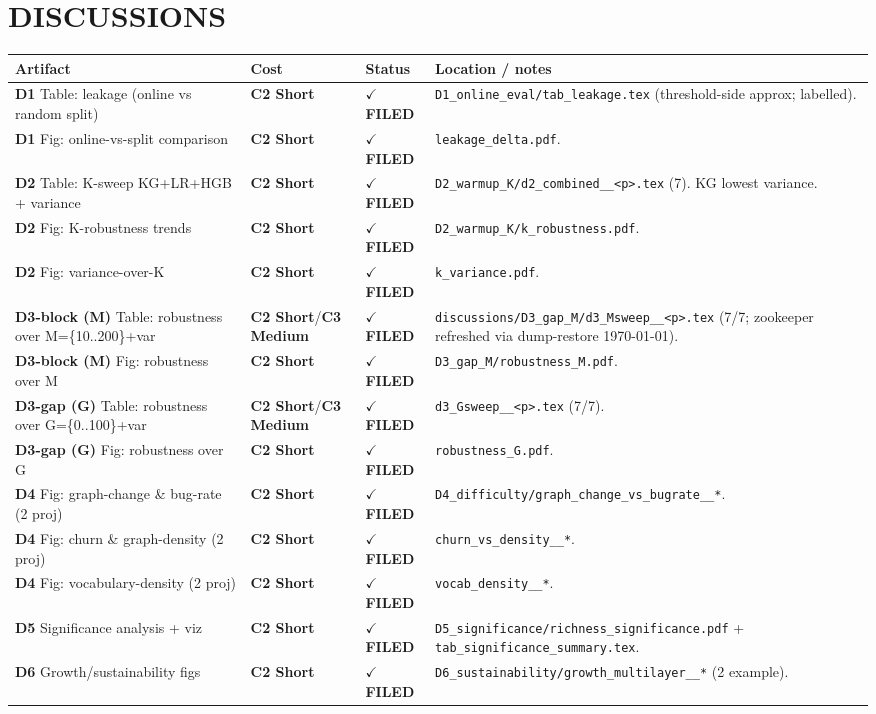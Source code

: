 \documentclass[10pt]{article}
\providecommand{\code}[1]{\texttt{\small #1}}
\newcommand{\Ctwo}{\textcolor{blue!65!black}{\textbf{C2 Short}}}
\newcommand{\Cthree}{\textcolor{orange!85!black}{\textbf{C3 Medium}}}
\newcommand{\DONE}{\textcolor{green!45!black}{\textbf{$\checkmark$ FILED}}}
\begin{document}
\section*{DISCUSSIONS}
\begin{longtable}{p{7.0cm}p{1.4cm}p{1.6cm}p{5.4cm}}
\toprule
Artifact & Cost & Status & Location / notes \\ \midrule\endhead
\textbf{D1} Table: leakage (online vs random split) & \Ctwo & \DONE & \code{D1\_online\_eval/tab\_leakage.tex} (threshold-side approx; labelled). \\
\textbf{D1} Fig: online-vs-split comparison & \Ctwo & \DONE & \code{leakage\_delta.pdf}. \\
\textbf{D2} Table: K-sweep KG+LR+HGB + variance & \Ctwo & \DONE & \code{D2\_warmup\_K/d2\_combined\_\_<p>.tex} (7). KG lowest variance. \\
\textbf{D2} Fig: K-robustness trends & \Ctwo & \DONE & \code{D2\_warmup\_K/k\_robustness.pdf}. \\
\textbf{D2} Fig: variance-over-K & \Ctwo & \DONE & \code{k\_variance.pdf}. \\
\textbf{D3-block (M)} Table: robustness over M=\{10..200\}+var & \Ctwo/\Cthree & \DONE & \code{discussions/D3\_gap\_M/d3\_Msweep\_\_<p>.tex} (7/7; zookeeper refreshed via dump-restore \today). \\
\textbf{D3-block (M)} Fig: robustness over M & \Ctwo & \DONE & \code{D3\_gap\_M/robustness\_M.pdf}. \\
\textbf{D3-gap (G)} Table: robustness over G=\{0..100\}+var & \Ctwo/\Cthree & \DONE & \code{d3\_Gsweep\_\_<p>.tex} (7/7). \\
\textbf{D3-gap (G)} Fig: robustness over G & \Ctwo & \DONE & \code{robustness\_G.pdf}. \\
\textbf{D4} Fig: graph-change \& bug-rate (2 proj) & \Ctwo & \DONE & \code{D4\_difficulty/graph\_change\_vs\_bugrate\_\_*}. \\
\textbf{D4} Fig: churn \& graph-density (2 proj) & \Ctwo & \DONE & \code{churn\_vs\_density\_\_*}. \\
\textbf{D4} Fig: vocabulary-density (2 proj) & \Ctwo & \DONE & \code{vocab\_density\_\_*}. \\
\textbf{D5} Significance analysis + viz & \Ctwo & \DONE & \code{D5\_significance/richness\_significance.pdf} + \code{tab\_significance\_summary.tex}. \\
\textbf{D6} Growth/sustainability figs & \Ctwo & \DONE & \code{D6\_sustainability/growth\_multilayer\_\_*} (2 example). \\
\bottomrule
\end{longtable}
\end{document}
